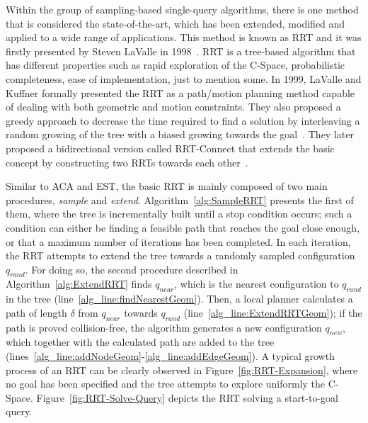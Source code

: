 Within the group of sampling-based single-query algorithms, there is one method
that is considered the state-of-the-art, which has been extended, modified and
applied to a wide range of applications. This method is known as \ac{RRT} and it
was firstly presented by Steven LaValle in 1998~\cite{LaValle1998}.
\ac{RRT} is a tree-based algorithm that has different properties such as rapid
exploration of the \ac{C-Space}, probabilistic completeness, ease of
implementation, just to mention some. In 1999, LaValle and Kuffner formally
presented the \ac{RRT} as a path/motion planning method capable of dealing with
both geometric and motion constraints. They also proposed a greedy approach to
decrease the time required to find a solution by interleaving a random growing
of the tree with a biased growing towards the
goal~\cite{LaValle1999,LaValle2000,LaValle2001}. They later proposed a
bidirectional version called RRT-Connect that extends the basic concept by
constructing two \acp{RRT} towards each other~\cite{Kuffner2000}.

Similar to \ac{ACA} and \ac{EST}, the basic \ac{RRT} is mainly composed of two
main procedures, \textit{sample} and \textit{extend}.
Algorithm~\ref{alg:SampleRRT} presents the first of them, where the tree is
incrementally built until a stop condition occurs; such a condition can either
be finding a feasible path that reaches the goal close enough, or that a maximum
number of iterations has been completed. In each iteration, the \ac{RRT}
attempts to extend the tree towards a randomly sampled configuration $q_{rand}$.
For doing so, the second procedure described in Algorithm~\ref{alg:ExtendRRT}
finds $q_{near}$, which is the nearest configuration to $q_{rand}$ in the tree
(line~\ref{alg_line:findNearestGeom}).
Then, a local planner calculates a path of length $\delta$ from $q_{near}$
towards $q_{rand}$ (line~\ref{alg_line:ExtendRRTGeom}); if the path is proved
collision-free, the algorithm generates a new configuration $q_{new}$, which
together with the calculated path are added to the tree
(lines~\ref{alg_line:addNodeGeom}-\ref{alg_line:addEdgeGeom}). A typical growth
process of an \ac{RRT} can be clearly observed in
Figure~\ref{fig:RRT-Expansion}, where no goal has been specified and the tree
attempts to explore uniformly the \ac{C-Space}.
Figure~\ref{fig:RRT-Solve-Query} depicts the \ac{RRT} solving a start-to-goal
query.

